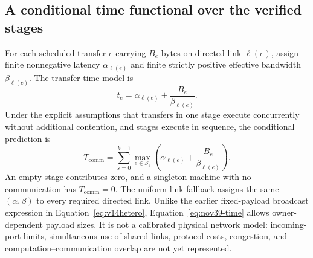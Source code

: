 \documentclass[11pt]{article}
\begin{document}
\subsection{A conditional time functional over the verified stages}
For each scheduled transfer $e$ carrying $B_e$ bytes on directed link
$\ell(e)$, assign finite nonnegative latency $\alpha_{\ell(e)}$ and
finite strictly positive effective bandwidth $\beta_{\ell(e)}$.
The transfer-time model is
\begin{equation}
 t_e=\alpha_{\ell(e)}+\frac{B_e}{\beta_{\ell(e)}}.
 \label{eq:nov39-transfer}
\end{equation}
Under the explicit assumptions that transfers in one stage execute
concurrently without additional contention, and stages execute in
sequence, the conditional prediction is
\begin{equation}
 \boxed{T_{\mathrm{comm}}=\sum_{s=0}^{k-1}
 \max_{e\in S_s}\left(\alpha_{\ell(e)}+
 \frac{B_e}{\beta_{\ell(e)}}\right).}
 \label{eq:nov39-time}
\end{equation}
An empty stage contributes zero, and a singleton machine with no
communication has $T_{\mathrm{comm}}=0$. The uniform-link fallback
assigns the same $(\alpha,\beta)$ to every required directed link.
Unlike the earlier fixed-payload broadcast expression in
Equation~\eqref{eq:v14hetero}, Equation~\eqref{eq:nov39-time}
allows owner-dependent payload sizes. It is not a calibrated physical
network model: incoming-port limits, simultaneous use of shared links,
protocol costs, congestion, and computation--communication overlap are
not yet represented.
\end{document}
